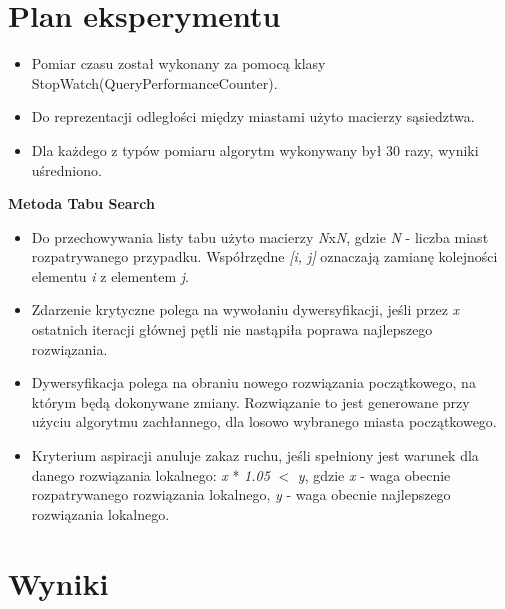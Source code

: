 \documentclass{article}
\begin{document}
\section{Plan eksperymentu}
\par
\begin{itemize}
\item Pomiar czasu został wykonany za pomocą klasy StopWatch(QueryPerformanceCounter).
\item Do reprezentacji odległości między miastami użyto macierzy sąsiedztwa.
\item Dla każdego z typów pomiaru algorytm wykonywany był 30 razy, wyniki uśredniono.
\end{itemize}

\textbf{Metoda Tabu Search}
\renewcommand\labelitemii{$\circ$}
\begin{itemize}
	\item Do przechowywania listy tabu użyto macierzy \textit{N}x\textit{N}, gdzie \textit{N} - liczba miast rozpatrywanego przypadku. Współrzędne \textit{[i, j]} oznaczają zamianę  kolejności elementu \textit{i} z elementem \textit{j}.
	\item Zdarzenie krytyczne polega na wywołaniu dywersyfikacji, jeśli przez \textit{x} ostatnich iteracji głównej pętli nie nastąpiła poprawa najlepszego rozwiązania.
	\item Dywersyfikacja polega na obraniu nowego rozwiązania początkowego, na którym będą dokonywane zmiany. Rozwiązanie to jest generowane przy użyciu algorytmu zachłannego, dla losowo wybranego miasta początkowego.
	\item Kryterium aspiracji anuluje zakaz ruchu, jeśli spełniony jest warunek dla danego rozwiązania lokalnego: \textit{x} * \textit{1.05} $<$  \textit{y}, gdzie \textit{x} - waga obecnie rozpatrywanego rozwiązania lokalnego, \newline \textit{y} - waga obecnie najlepszego rozwiązania lokalnego.
\end{itemize}
\newpage

\section{Wyniki}
\end{document}
